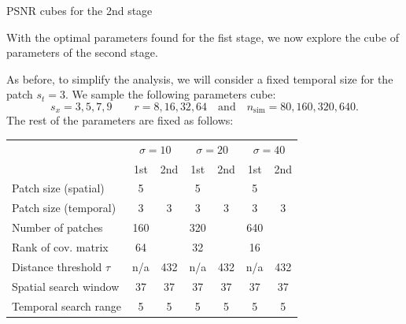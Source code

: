 \documentclass[mathserif, 8pt]{beamer}
\begin{document}
\begin{frame}{PSNR cubes for the 2nd stage}

	With the optimal parameters found for the fist stage, we now explore the
	cube of parameters of the second stage.

	\bigskip

	As before, to simplify the analysis, we will consider a fixed temporal size for the 
	patch $s_t = 3$. We sample the following parameters cube:
	\[s_x = 3, 5, 7, 9 \quad\quad r = 8, 16, 32, 64 \quad\text{and}\quad n_{\text{sim}} = 80, 160, 320, 640.\] 
	The rest of the parameters are fixed as follows:

	\begin{center}
	\begin{tabular}{l | c c | c c | c c }
		& \multicolumn{2}{c|}{$\sigma = 10$} 
		& \multicolumn{2}{c|}{$\sigma = 20$} 
		& \multicolumn{2}{c}{$\sigma = 40$} \\
		                            & 1st  & 2nd  & 1st  & 2nd  & 1st  & 2nd \\\hline\hline
		Patch size (spatial)        &  5   &      &  5   &      &  5   &     \\
		Patch size (temporal)       &  3   &   3  &  3   &   3  &  3   &   3 \\
		Number of patches           & 160  &      & 320  &      & 640  &     \\
		Rank of cov. matrix         & 64   &      & 32   &      & 16   &     \\
		Distance threshold $\tau$   & n/a  & 432  & n/a  & 432  & n/a  & 432 \\
		Spatial search window       & 37   &  37  & 37   &  37  & 37   &  37 \\
		Temporal search range       & 5    & 5    & 5    & 5    & 5    & 5   \\\hline
	\end{tabular}
	\end{center}

\end{frame}
\end{document}
